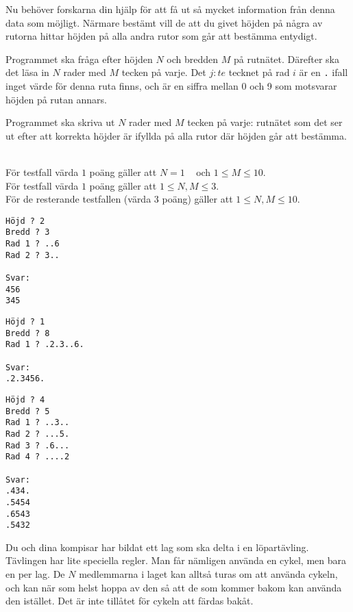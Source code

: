 Nu behöver forskarna din hjälp för att få ut så mycket information
från denna data som möjligt. Närmare bestämt vill de att du givet höjden
på några av rutorna hittar höjden på alla andra rutor som går att bestämma entydigt.

Programmet ska fråga efter höjden $N$ och bredden $M$ på rutnätet.
Därefter ska det läsa in $N$ rader med $M$ tecken på varje.
Det $j:te$ tecknet på rad $i$ är en \texttt{.} ifall
inget värde för denna ruta finns, och är en siffra mellan
0 och 9 som motsvarar höjden på rutan annars.

Programmet ska skriva ut $N$ rader med $M$ tecken på varje:
rutnätet som det ser ut efter att korrekta höjder är ifyllda på alla rutor där höjden går att bestämma.


\\
För testfall värda $1$ poäng gäller att $N=1\;\;\;$ och $1\leq M \leq 10$. \\
För testfall värda $1$ poäng gäller att $1\leq N,M \leq 3 $. \\
För de resterande testfallen (värda $3$ poäng) gäller att $1\leq N,M \leq 10$.

\begin{multicols}{2}
\begin{verbatim}
Höjd ? 2
Bredd ? 3
Rad 1 ? ..6
Rad 2 ? 3..

Svar:
456
345
\end{verbatim}

\begin{verbatim}
Höjd ? 1
Bredd ? 8
Rad 1 ? .2.3..6.

Svar:
.2.3456.
\end{verbatim}

\vfill\columnbreak

\begin{verbatim}
Höjd ? 4
Bredd ? 5
Rad 1 ? ..3..
Rad 2 ? ...5.
Rad 3 ? .6...
Rad 4 ? ....2

Svar:
.434.
.5454
.6543
.5432
\end{verbatim}
\end{multicols}
\newpage
{}

\newpage
{}

Du och dina kompisar har bildat ett lag som ska delta i en löpartävling. Tävlingen har lite speciella regler.
Man får nämligen använda en cykel, men bara en per lag. De $N$ medlemmarna i laget kan alltså turas om att använda cykeln, och kan
när som helst hoppa av den så att de som kommer bakom kan använda den istället. Det är inte tillåtet för cykeln att färdas bakåt.


